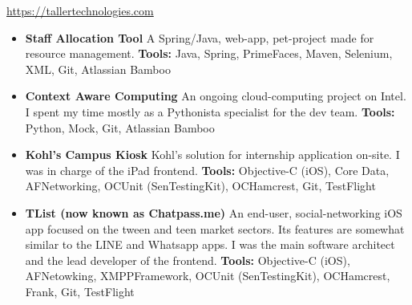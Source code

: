 \documentclass[11pt,a4paper,english]{moderncv}
\begin{document}
{
\url{https://tallertechnologies.com}
\newline{}
\begin{itemize}
    \item \textbf{Staff Allocation Tool}
        \newline{}
        A Spring/Java, web-app, pet-project made for resource management.
        \newline{}
        \textbf{Tools:} Java, Spring, PrimeFaces, Maven, Selenium, XML, Git, Atlassian Bamboo
    \item \textbf{Context Aware Computing}
        \newline{}
        An ongoing cloud-computing project on Intel. I spent my time mostly as a Pythonista specialist for the dev team.
        \newline{}
        \textbf{Tools:} Python, Mock, Git, Atlassian Bamboo
    \item \textbf{Kohl's Campus Kiosk}
        \newline{}
        Kohl's solution for internship application on-site. I was in charge of the iPad frontend.
        \newline{}
        \textbf{Tools:} Objective-C (iOS), Core Data, AFNetworking, OCUnit (SenTestingKit), OCHamcrest, Git, TestFlight
    \item \textbf{TList (now known as Chatpass.me)}
        \newline{}
        An end-user, social-networking iOS app focused on the tween and teen market sectors. Its features are somewhat similar to the LINE and Whatsapp apps. I was the main software architect and the lead developer of the frontend.
        \newline{}
        \textbf{Tools:} Objective-C (iOS), AFNetowking, XMPPFramework, OCUnit (SenTestingKit), OCHamcrest, Frank, Git, TestFlight
\end{itemize}
}

\subsection{}
\end{document}
